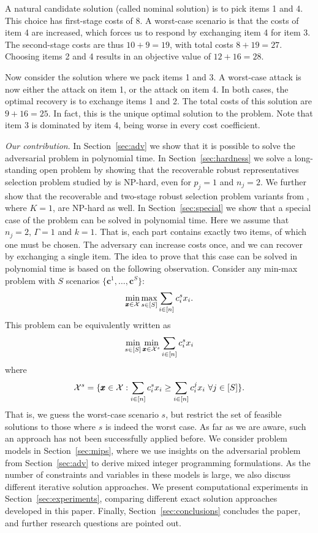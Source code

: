 A natural candidate solution (called nominal solution) is to pick items 1 and 4. This choice has first-stage costs of 8. A worst-case scenario is that the costs of item 4 are increased, which forces us to respond by exchanging item 4 for item 3. The second-stage costs are thus $10+9=19$, with total costs $8 + 19 = 27$. Choosing items 2 and 4 results in an objective value of $12+16=28$.

Now consider the solution where we pack items 1 and 3. A worst-case attack is now either the attack on item 1, or the attack on item 4. In both cases, the optimal recovery is to exchange items 1 and 2. The total costs of this solution are $9+16 = 25$. In fact, this is the unique optimal solution to the problem.
Note that item 3 is dominated by item 4, being worse in every cost coefficient. 

\emph{Our contribution}. In Section~\ref{sec:adv} we show that it is possible to solve the adversarial problem in polynomial time. In Section~\ref{sec:hardness} we solve a long-standing open problem by showing that the recoverable robust representatives selection problem studied by \cite{busing2011phd} is NP-hard, even for $p_j=1$ and $n_j=2$. We further show that the recoverable and two-stage robust selection problem variants from \cite{chassein2018recoverable}, where $K=1$, are NP-hard as well. In Section~\ref{sec:special} we show that a special case of the problem can be solved in polynomial time. Here we assume that $n_j=2$, $\Gamma=1$ and $k=1$. That is, each part contains exactly two items, of which one must be chosen. The adversary can increase costs once, and we can recover by exchanging a single item. The idea to prove that this case can be solved in polynomial time is based on the following observation. Consider any min-max problem with $S$ scenarios $\{\pmb{c}^1,\ldots,\pmb{c}^S\}$:
\[ \min_{\pmb{x}\in\mathcal{X}} \max_{s\in[S]} \sum_{i\in[n]} c^s_i x_i.\]
This problem can be equivalently written as
\[ \min_{s\in[S]} \min_{\pmb{x}\in\mathcal{X}^s} \sum_{i\in[n]} c^s_i x_i \]
where
\[ \mathcal{X}^s = \{ \pmb{x}\in\mathcal{X} : \sum_{i\in[n]} c^s_i x_i \ge \sum_{i\in[n]} c^{j}_i x_i\ \forall j\in[S] \}. \]
That is, we guess the worst-case scenario $s$, but restrict the set of feasible solutions to those where $s$ is indeed the worst case. As far as we are aware, such an approach has not been successfully applied before. 
We consider problem models in Section~\ref{sec:mips}, where we use insights on the adversarial problem from Section~\ref{sec:adv} to derive mixed integer programming formulations. As the number of constraints and variables in these models is large, we also discuss different iterative solution approaches. 
We present computational experiments in Section~\ref{sec:experiments}, comparing different exact solution approaches developed in this paper. Finally, Section~\ref{sec:conclusions} concludes the paper, and further research questions are pointed out.



